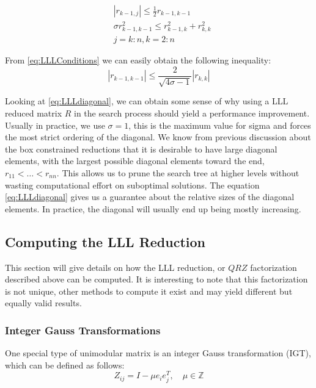 \documentclass[12pt,Bold,letterpaper]{mcgilletdclass}
\newcommand{\vsp}{\vspace{\baselineskip}}
\begin{document}
\begin{align} \label{eq:LLLConditions}
&\left | r_{k-1,j} \right | \le \frac{1}{2}r_{k-1,k-1} \\
&\sigma r_{k-1,k-1}^2 \le r_{k-1,k}^2 + r_{k,k}^2 \\
&j = k:n, k=2:n
\end{align}

From \eqref{eq:LLLConditions} we can easily obtain the following inequality:
\begin{equation} \label{eq:LLLdiagonal}
\left | r_{k-1,k-1} \right | \le \frac{2}{\sqrt{4\sigma -1}}\left | r_{k,k} \right |
\end{equation}

Looking at \eqref{eq:LLLdiagonal}, we can obtain some sense of why using a LLL reduced matrix $R$ in the search process should yield a performance improvement. Usually in practice, we use $\sigma=1$, this is the maximum value for sigma and forces the most strict ordering of the diagonal. We know from previous discussion about the box constrained reductions that it is desirable to have large diagonal elements, with the largest possible diagonal elements toward the end, $r_{11} < \dots < r_{nn}$. This allows us to prune the search tree at higher levels without wasting computational effort on suboptimal solutions. The equation \eqref{eq:LLLdiagonal} gives us a guarantee about the relative sizes of the diagonal elements. In practice, the diagonal will usually end up being mostly increasing.

\vsp \subsection{Computing the LLL Reduction}
This section will give details on how the LLL reduction, or $QRZ$ factorization described above can be computed. It is interesting to note that this factorization is not unique, other methods to compute it exist and may yield different but equally valid results.

\vsp \subsubsection{Integer Gauss Transformations} \label{subsec:IGT}

One special type of unimodular matrix is an integer Gauss transformation (IGT), which can be defined as follows:
\begin{equation}
Z_{ij} = I-\mu e_ie_j^T, \quad \mu \in \mathbb{Z}
\end{equation}
\end{document}
